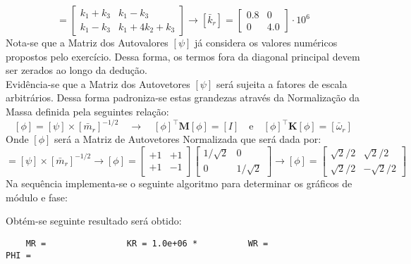 \documentclass{article}
\begin{document}
\begin{resolution}
\begin{equation*}
    \end{equation*}
    \begin{equation*}
        [\bar{k}_r] = 
        \begin{bmatrix} k_1+k_3 & k_1-k_3\\ k_1-k_3 & k_1 + 4k_2 + k_3\end{bmatrix} \to 
        \boxed{[\bar{k}_r] = \begin{bmatrix} 0.8 & 0\\ 0 & 4.0\end{bmatrix}\cdot 10^6}
    \end{equation*}
    Nota-se que a Matriz dos Autovalores $[\psi]$ já considera os valores numéricos propostos pelo exercício. Dessa forma, os termos fora da diagonal principal devem ser zerados ao longo da dedução.\\

    Evidência-se que a Matriz dos Autovetores $[\psi]$ será sujeita a fatores de escala arbitrários. Dessa forma padroniza-se estas grandezas através da Normalização da Massa definida pela seguintes relação:
    \begin{equation}
        \boxed{[\phi] = [\psi] \times [\bar{m}_r]^{-1/2}}
        \quad \to \quad
        \boxed{[\phi]^\intercal \mathbf{M} [\phi] = [I]}
        \quad\text{e}\quad
        \boxed{[\phi]^\intercal \mathbf{K} [\phi] = [\bar{\omega}_r]}
    \end{equation}
    Onde $[\phi]$ será a Matriz de Autovetores Normalizada que será dada por:
    \begin{equation*}
        [\phi] = [\psi] \times [\bar{m}_r]^{-1/2}
        \to
        [\phi] = \begin{bmatrix} +1 & +1\\ +1 & -1\end{bmatrix} \begin{bmatrix} 1/\sqrt{2} & 0\\ 0 & 1/\sqrt{2}\end{bmatrix}
        \to 
        \boxed{[\phi] = \begin{bmatrix} \sqrt{2}/2 & \sqrt{2}/2\\ \sqrt{2}/2 & -\sqrt{2}/2\end{bmatrix}}
    \end{equation*}
    Na sequência implementa-se o seguinte algoritmo para determinar os gráficos de módulo e fase:
    \begin{scriptsize}
        \myMatlab
    \end{scriptsize}
    Obtém-se seguinte resultado será obtido:
    \begin{scriptsize}
        \myMatlab\begin{lstlisting}
    MR =                KR = 1.0e+06 *          WR =                        PHI =


\end{lstlisting}
\end{scriptsize}
\end{resolution}
\end{document}
